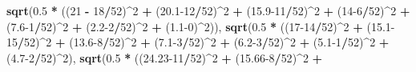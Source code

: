 \documentclass[11pt, oneside]{article}   	%
\newenvironment{Shaded}{\begin{snugshade}}{\end{snugshade}}
\newcommand{\DecValTok}[1]{\textcolor[rgb]{0.00,0.00,0.81}{#1}}
\newcommand{\FloatTok}[1]{\textcolor[rgb]{0.00,0.00,0.81}{#1}}
\newcommand{\KeywordTok}[1]{\textcolor[rgb]{0.13,0.29,0.53}{\textbf{#1}}}
\newcommand{\NormalTok}[1]{#1}
\newcommand{\OperatorTok}[1]{\textcolor[rgb]{0.81,0.36,0.00}{\textbf{#1}}}
\newcommand{\StringTok}[1]{\textcolor[rgb]{0.31,0.60,0.02}{#1}}
\begin{document}
\begin{Shaded}
\begin{Highlighting}[]
{{{{{{                                  \KeywordTok{sqrt}\NormalTok{(}\FloatTok{0.5} \OperatorTok{*}\StringTok{ }\NormalTok{((}\DecValTok{21} \OperatorTok{-}\StringTok{ }\DecValTok{18}\OperatorTok{/}\DecValTok{52}\NormalTok{)}\OperatorTok{^}\DecValTok{2} \OperatorTok{+}\StringTok{ }\NormalTok{(}\FloatTok{20.1}\DecValTok{-12}\OperatorTok{/}\DecValTok{52}\NormalTok{)}\OperatorTok{^}\DecValTok{2} \OperatorTok{+}
\StringTok{                                                }\NormalTok{(}\FloatTok{15.9}\DecValTok{-11}\OperatorTok{/}\DecValTok{52}\NormalTok{)}\OperatorTok{^}\DecValTok{2} \OperatorTok{+}
\StringTok{                                                }\NormalTok{(}\DecValTok{14-6}\OperatorTok{/}\DecValTok{52}\NormalTok{)}\OperatorTok{^}\DecValTok{2} \OperatorTok{+}\StringTok{ }\NormalTok{(}\FloatTok{7.6}\DecValTok{-1}\OperatorTok{/}\DecValTok{52}\NormalTok{)}\OperatorTok{^}\DecValTok{2} \OperatorTok{+}\StringTok{ }
\StringTok{                                                }\NormalTok{(}\FloatTok{2.2}\DecValTok{-2}\OperatorTok{/}\DecValTok{52}\NormalTok{)}\OperatorTok{^}\DecValTok{2} \OperatorTok{+}\StringTok{ }\NormalTok{(}\FloatTok{1.1}\DecValTok{-0}\NormalTok{)}\OperatorTok{^}\DecValTok{2}\NormalTok{)), }
                                  \KeywordTok{sqrt}\NormalTok{(}\FloatTok{0.5} \OperatorTok{*}\StringTok{ }\NormalTok{((}\DecValTok{17-14}\OperatorTok{/}\DecValTok{52}\NormalTok{)}\OperatorTok{^}\DecValTok{2} \OperatorTok{+}\StringTok{ }\NormalTok{(}\FloatTok{15.1}\DecValTok{-15}\OperatorTok{/}\DecValTok{52}\NormalTok{)}\OperatorTok{^}\DecValTok{2} \OperatorTok{+}
\StringTok{                                                }\NormalTok{(}\FloatTok{13.6}\DecValTok{-8}\OperatorTok{/}\DecValTok{52}\NormalTok{)}\OperatorTok{^}\DecValTok{2} \OperatorTok{+}\StringTok{ }
\StringTok{                                                }\NormalTok{(}\FloatTok{7.1}\DecValTok{-3}\OperatorTok{/}\DecValTok{52}\NormalTok{)}\OperatorTok{^}\DecValTok{2} \OperatorTok{+}\StringTok{ }\NormalTok{(}\FloatTok{6.2}\DecValTok{-3}\OperatorTok{/}\DecValTok{52}\NormalTok{)}\OperatorTok{^}\DecValTok{2} \OperatorTok{+}\StringTok{ }
\StringTok{                                                }\NormalTok{(}\FloatTok{5.1}\DecValTok{-1}\OperatorTok{/}\DecValTok{52}\NormalTok{)}\OperatorTok{^}\DecValTok{2} \OperatorTok{+}\StringTok{ }\NormalTok{(}\FloatTok{4.7}\DecValTok{-2}\OperatorTok{/}\DecValTok{52}\NormalTok{)}\OperatorTok{^}\DecValTok{2}\NormalTok{), }
                                  \KeywordTok{sqrt}\NormalTok{(}\FloatTok{0.5} \OperatorTok{*}\StringTok{ }\NormalTok{((}\FloatTok{24.23}\DecValTok{-11}\OperatorTok{/}\DecValTok{52}\NormalTok{)}\OperatorTok{^}\DecValTok{2} \OperatorTok{+}\StringTok{ }\NormalTok{(}\FloatTok{15.66}\DecValTok{-8}\OperatorTok{/}\DecValTok{52}\NormalTok{)}\OperatorTok{^}\DecValTok{2} \OperatorTok{+}
}}}}}}
\end{Highlighting}
\end{Shaded}
\end{document}
